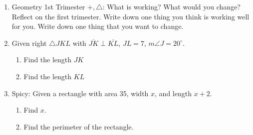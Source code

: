 \documentclass[12pt, oneside]{article}
\begin{document}
\begin{enumerate}
\item Geometry 1st Trimester $+, \triangle$: What is working? What would you change?\\
Reflect on the first trimester. Write down one thing you think is working well for you. Write down one thing that you want to change.

\newpage
  \item Given right $\triangle JKL$ with $\overline{JK} \perp \overline{KL}$, $JL=7$, $m\angle J=20^\circ$.
    \begin{center}
       \vspace{1cm}
    \end{center}
    \begin{enumerate}
      \item Find the length $JK$\\[3cm]
      \item Find the length $KL$\\[2cm]
    \end{enumerate}

    \item Spicy: Given a rectangle with area 35, width $x$, and length $x+2$.
      \begin{enumerate}
        \item Find $x$.\\[4cm]
        \item Find the perimeter of the rectangle.
      \end{enumerate}

\end{enumerate}
\end{document}
